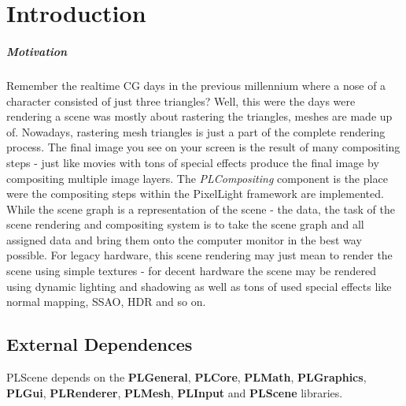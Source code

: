 \chapter{Introduction}


\paragraph{Motivation}
Remember the realtime CG days in the previous millennium where a nose of a character consisted of just three triangles? Well, this were the days were rendering a scene was mostly about rastering the triangles, meshes are made up of. Nowadays, rastering mesh triangles is just a part of the complete rendering process. The final image you see on your screen is the result of many compositing steps - just like movies with tons of special effects produce the final image by compositing multiple image layers. The \emph{PLCompositing} component is the place were the compositing steps within the PixelLight framework are implemented. While the scene graph is a representation of the scene - the data, the task of the scene rendering and compositing system is to take the scene graph and all assigned data and bring them onto the computer monitor in the best way possible. For legacy hardware, this scene rendering may just mean to render the scene using simple textures - for decent hardware the scene may be rendered using dynamic lighting and shadowing as well as tons of used special effects like normal mapping, SSAO, HDR and so on.




\section{External Dependences}
PLScene depends on the \textbf{PLGeneral}, \textbf{PLCore}, \textbf{PLMath}, \textbf{PLGraphics}, \textbf{PLGui}, \textbf{PLRenderer}, \textbf{PLMesh}, \textbf{PLInput} and \textbf{PLScene} libraries.
